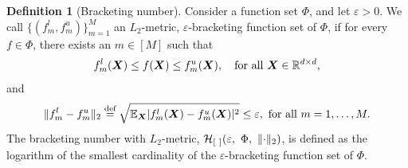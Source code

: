 \documentclass[11pt]{article}
\theoremstyle{plain}
\theoremstyle{definition}
\newtheorem{defn}{Definition}
\begin{document}
\begin{defn}[Bracketing number]\label{pro:inftynorm}
Consider a function set $\Phi$, and let $\varepsilon>0$. We call $\{(f^l_m,f^u_m)\}_{m=1}^M$ an $L_2$-metric, $\varepsilon$-bracketing function set of $\Phi$, if for every $f\in \Phi$, there exists an $m\in[M]$ such that 
\[
f^l_m(\bm X)\leq f(\bm X)\leq f^u_m(\bm X),\quad \text{for all }\bm X\in\mathbb{R}^{d\times d},
\]
and
\[
\lVert f^l_m-f^u_m\rVert_2\stackrel{\text{def}}{=}\sqrt{\mathbb{E}_{\bm X}|f^l_m(\bm X)-f^u_m(\bm X)|^2} \leq \varepsilon, \ \text{for all } m=1,\ldots,M. 
\]
The bracketing number with $L_2$-metric, $\tH_{[\ ]}(\varepsilon,\ \Phi,\ \vnormSize{}{\cdot})$, is defined as the logarithm of the smallest cardinality of the $\varepsilon$-bracketing function set of $\Phi$.  
\end{defn}
\end{document}

